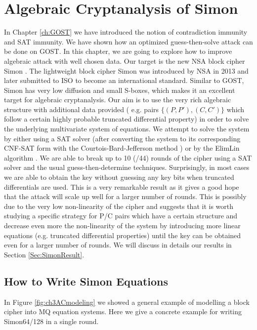 \chapter{Algebraic Cryptanalysis of Simon}\label{ch:SIMON}
In Chapter \ref{ch:GOST} we have introduced the notion of contradiction immunity and SAT immunity. We have shown how an optimized guess-then-solve attack can be done on GOST. In this chapter, we are going to explore how to improve algebraic attack with well chosen data. Our target is the new NSA block cipher Simon \cite{NSAciphers}. The lightweight block cipher Simon was introduced by NSA in 2013 and later submitted to ISO to become an international standard. Similar to GOST, Simon has very low diffusion and small S-boxes, which makes it an excellent target for algebraic cryptanalysis. Our aim is to use the very rich algebraic structure
with additional data provided ( e.g. pairs $\{(P,P'),(C,C')\}$ which
follow a certain highly probable truncated differential property) in order to solve
the underlying multivariate system of equations. We attempt to solve the system
by either using a SAT solver (after converting the system to its corresponding
CNF-SAT form with the Courtois-Bard-Jefferson method \cite{BardCourtoiJeffersonConv}) or by the ElimLin algorithm \cite{FourMNL,OptimiPaper,OptimiPaper2}.
We are able to break up to 10 (/44) rounds of the cipher using
a SAT solver and the usual guess-then-determine techniques.
Surprisingly, in most cases we are
able to obtain the key without guessing any key bits
when truncated differentials are used.
This is a very remarkable result as it gives a good hope that the attack will scale up well for a larger number of rounds. This is possibly due to the very low non-linearity of the cipher and suggests that it is worth studying a specific strategy for P/C pairs which have a certain structure and decrease even more the non-linearity of the system by introducing
more linear equations (e.g. truncated differential properties)
until the key can be obtained even for a larger number of rounds. We will discuss in details our results in Section \ref{Sec:SimonResult}.


\section{How to Write Simon Equations}
In Figure \ref{fig:ch3ACmodeling} we showed a general example of modelling a block cipher into MQ equation systems. Here we give a concrete example for writing Simon64/128 in a single round.

